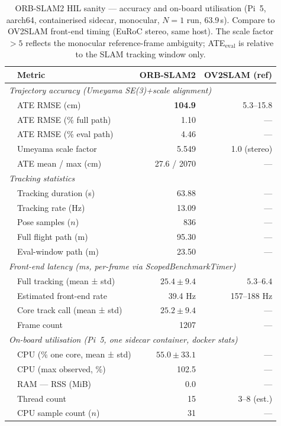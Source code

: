 \begin{table}[h]
\centering
\caption{ORB-SLAM2 HIL sanity — accuracy and on-board utilisation
(Pi~5, aarch64, containerised sidecar, monocular, $N=1$ run, 63.9\,s).
Compare to OV2SLAM front-end timing (EuRoC stereo, same host).
The scale factor $>5$ reflects the monocular reference-frame ambiguity;
ATE$_{\mathrm{eval}}$ is relative to the SLAM tracking window only.}
\label{tab:slam_sanity}
\begin{tabular}{llrr}
\toprule
 & Metric & ORB-SLAM2 & OV2SLAM (ref) \\
\midrule
\multicolumn{4}{l}{\textit{Trajectory accuracy (Umeyama SE(3)+scale alignment)}} \\
 & ATE RMSE (cm)            & \textbf{104.9}  & 5.3–15.8  \\
 & ATE RMSE (\% full path)  & 1.10  & —    \\
 & ATE RMSE (\% eval path)  & 4.46  & —    \\
 & Umeyama scale factor      & 5.549         & 1.0 (stereo)  \\
 & ATE mean / max (cm)      & 27.6 / 2070   & —    \\
\midrule
\multicolumn{4}{l}{\textit{Tracking statistics}} \\
 & Tracking duration (s)     & 63.88         & —    \\
 & Tracking rate (Hz)        & 13.09         & —    \\
 & Pose samples ($n$)        & 836           & —    \\
 & Full flight path (m)      & 95.30         & —    \\
 & Eval-window path (m)      & 23.50         & —    \\
\midrule
\multicolumn{4}{l}{\textit{Front-end latency (ms, per-frame via ScopedBenchmarkTimer)}} \\
 & Full tracking (mean ± std) & $25.4 \pm 9.4$ & $5.3–6.4$  \\
 & Estimated front-end rate   & 39.4 Hz       & 157–188 Hz \\
 & Core track call (mean ± std) & $25.2 \pm 9.4$ & —    \\
 & Frame count                & 1207          & —    \\
\midrule
\multicolumn{4}{l}{\textit{On-board utilisation (Pi~5, one sidecar container, docker stats)}} \\
 & CPU (\% one core, mean ± std) & $55.0 \pm 33.1$ & —  \\
 & CPU (max observed, \%)    & 102.5         & —    \\
 & RAM — RSS (MiB)           & $0.0$         & —    \\
 & Thread count              & 15            & 3–8 (est.)    \\
 & CPU sample count ($n$)    & 31            & —    \\
\bottomrule
\end{tabular}
\end{table}


